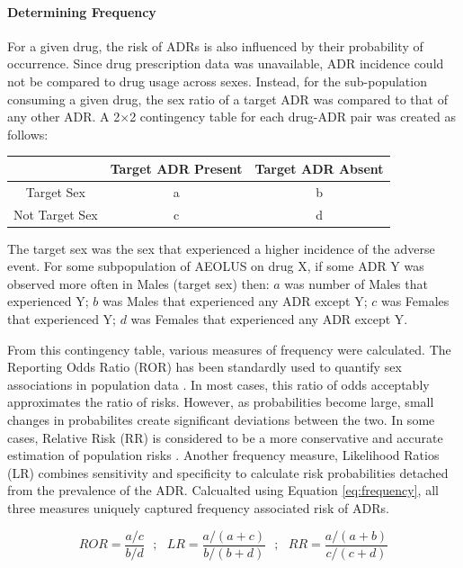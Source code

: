 \documentclass[11pt, oneside]{article}
\begin{document}
\paragraph{Determining Frequency}

For a given drug, the risk of ADRs is also influenced by their probability of occurrence. Since drug prescription data was unavailable, ADR incidence could not be compared to drug usage across sexes. Instead, for the sub-population consuming a given drug, the sex ratio of a target ADR was compared to that of any other ADR. A 2$\times$2 contingency table for each drug-ADR pair was created as follows: 

\hfill
\begin{center}
\begin{tabular}{ |c|cc| } 
	 \hline
	  & Target ADR Present & Target ADR Absent \\ 
	 \hline
	 Target Sex & a & b \\ 
	 Not Target Sex & c & d \\ 
	 \hline
\end{tabular}
\end{center}
\hfill

The target sex was the sex that experienced a higher incidence of the adverse event. For some subpopulation of AEOLUS on drug X, if some ADR Y was observed more often in Males (target sex) then: $a$ was number of Males that experienced Y; $b$ was Males that experienced any ADR except Y; $c$ was Females that experienced Y; $d$ was Females that experienced any ADR except Y. 

From this contingency table, various measures of frequency were calculated. The Reporting Odds Ratio (ROR) has been standardly used to quantify sex associations in population data \cite{yu_systematic_2016,rodenburg_sex_2012}. In most cases, this ratio of odds acceptably approximates the ratio of risks. However, as probabilities become large, small changes in probabilites create significant deviations between the two. In some cases, Relative Risk (RR) is considered to be a more conservative and accurate estimation of population risks \cite{sheldrick_math_2017, cummings_relative_2009}. Another frequency measure, Likelihood Ratios (LR) combines sensitivity and specificity to calculate risk probabilities detached from the prevalence of the ADR. Calcualted using Equation \ref{eq:frequency}, all three measures uniquely captured frequency associated risk of ADRs. 

\begin{equation} \label{eq:frequency}
	ROR = \frac{a/c}{b/d}\ \ \ ;\ \ \ LR =  \frac{a/(a+c)}{b/(b+d)}\ \ \ ;\ \ \ RR =  \frac{a/(a+b)}{c/(c+d)}
\end{equation}
\end{document}

